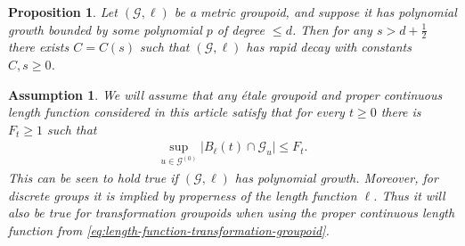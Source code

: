 \documentclass[11pt,a4paper,oneside,final,reqno]{amsart}
\newtheorem{proposition}[lemma]{Proposition}
\newtheorem{assumption}[lemma]{Assumption}
\theoremstyle{definition}
\newcommand{\G}{\mathcal{G}}
\newcommand{\Go}{\mathcal{G}^{(0)}}
\numberwithin{equation}{section}
\begin{document}
	\begin{proposition}\label{prop:degree-of-RD-from-PG}
		Let $(\G,\ell)$ be a metric groupoid, and suppose it has  polynomial growth bounded by some polynomial $p$ of degree $\leq d$. 
		Then for any $s > d + \frac{1}{2}$ there exists $C=C(s)$ such that $(\G, \ell)$ has rapid decay with constants $C,s \geq 0$.
	\end{proposition} 
	

	\begin{assumption}\label{assumption:uniform-fiber-cardinality-bound}
		We will assume that any \'etale groupoid and proper continuous length function considered in this article satisfy that for every $t \geq 0$ there is $F_t \geq 1$ such that
		\begin{align*}
			\sup_{u \in \Go} \vert B_\ell(t) \cap \G_u \vert \leq F_t.
		\end{align*}
		This can be seen to hold true if $(\G,\ell)$ has polynomial growth. Moreover, for discrete groups it is implied by properness of the length function $\ell$. Thus it will also be true for transformation groupoids when using the proper continuous length function from \eqref{eq:length-function-transformation-groupoid}.
	\end{assumption}
	
\end{document}
